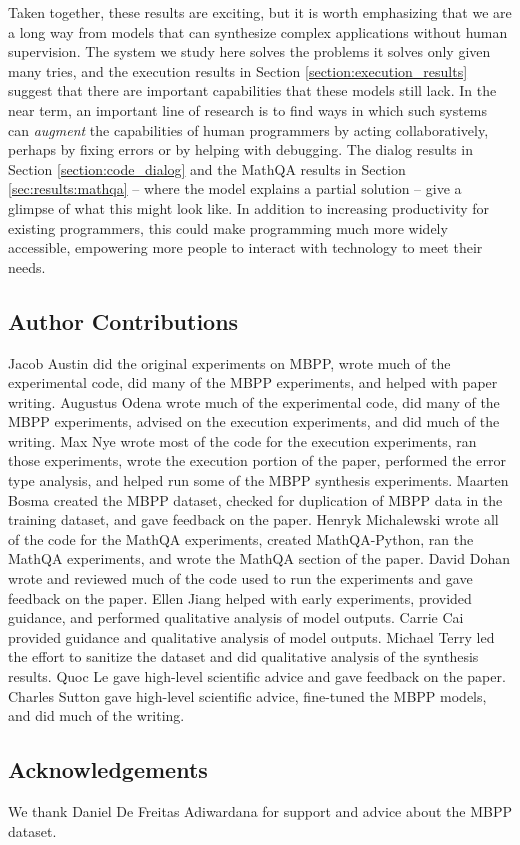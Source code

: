 Taken together, these results are exciting, but it is worth emphasizing that we are a long way from models that can synthesize complex applications without human supervision. The system we study here solves the problems it solves only given many tries, and the execution results in Section \ref{section:execution_results} suggest that there are important capabilities that these models still lack. In the near term, an important line of research is to find ways in which such systems can \textit{augment} the capabilities of human programmers by acting collaboratively, perhaps by fixing errors or by helping with debugging. The dialog results in Section \ref{section:code_dialog} and the MathQA results in Section \ref{sec:results:mathqa} -- where the model explains a partial solution -- give a glimpse of what this might look like. In addition to increasing productivity for existing programmers, this could make programming much more widely accessible, empowering more people to interact with technology to meet their needs.

\subsection*{Author Contributions} Jacob Austin did the original experiments on MBPP, wrote much of the experimental code, did many of the MBPP experiments, and helped with paper writing. Augustus Odena wrote much of the experimental code, did many of the MBPP experiments, advised on the execution experiments, and did much of the writing. Max Nye wrote most of the code for the execution experiments, ran those experiments, wrote the execution portion of the paper, performed the error type analysis, and helped run some of the MBPP synthesis experiments. Maarten Bosma created the MBPP dataset, checked for duplication of MBPP data in the training dataset, and gave feedback on the paper. Henryk Michalewski wrote all of the code for the MathQA experiments, created MathQA-Python, ran the MathQA experiments, and wrote the MathQA section of the paper. David Dohan wrote and reviewed much of the code used to run the experiments and gave feedback on the paper. Ellen Jiang helped with early experiments, provided guidance, and performed qualitative analysis of model outputs. Carrie Cai provided guidance and qualitative analysis of model outputs. Michael Terry led the effort to sanitize the dataset and did qualitative analysis of the synthesis results. Quoc Le gave high-level scientific advice and gave feedback on the paper. Charles Sutton gave high-level scientific advice, fine-tuned the MBPP models, and did much of the writing.
\subsection*{Acknowledgements}

We thank Daniel De Freitas Adiwardana for support and advice about the MBPP dataset.


